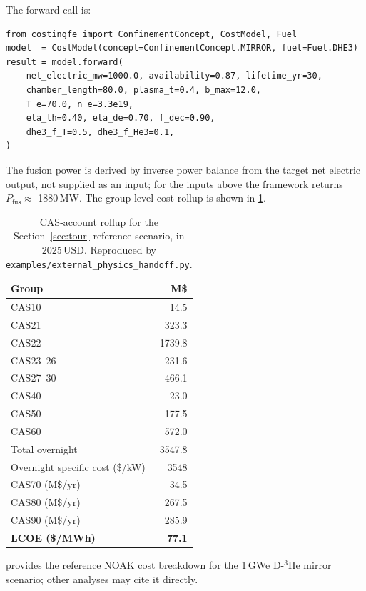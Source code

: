 \documentclass{article}
\begin{document}
The forward call is:

\begin{lstlisting}
from costingfe import ConfinementConcept, CostModel, Fuel
model  = CostModel(concept=ConfinementConcept.MIRROR, fuel=Fuel.DHE3)
result = model.forward(
    net_electric_mw=1000.0, availability=0.87, lifetime_yr=30,
    chamber_length=80.0, plasma_t=0.4, b_max=12.0,
    T_e=70.0, n_e=3.3e19,
    eta_th=0.40, eta_de=0.70, f_dec=0.90,
    dhe3_f_T=0.5, dhe3_f_He3=0.1,
)
\end{lstlisting}

The fusion power is derived by inverse power balance from the
target net electric output, not supplied as an input; for the inputs
above the framework returns $P_{\text{fus}} \approx$ 1880\,MW. The
group-level cost rollup is shown in \cref{tab:tour-rollup}.

\begin{table}[htbp]
\caption{CAS-account rollup for the Section~\ref{sec:tour} reference
scenario, in 2025\,USD. Reproduced by
\texttt{examples/external\_physics\_handoff.py}.}
\label{tab:tour-rollup}
\centering
\begin{tabular}{lr}
\toprule
Group & M\$ \\
\midrule
CAS10                  & 14.5 \\
CAS21                  & 323.3 \\
CAS22                  & 1739.8 \\
CAS23--26              & 231.6 \\
CAS27--30              & 466.1 \\
CAS40                  & 23.0 \\
CAS50                  & 177.5 \\
CAS60                  & 572.0 \\
\midrule
Total overnight        & 3547.8 \\
Overnight specific cost (\$/kW) & 3548 \\
\midrule
CAS70 (M\$/yr)         & 34.5 \\
CAS80 (M\$/yr)         & 267.5 \\
CAS90 (M\$/yr)         & 285.9 \\
\midrule
\textbf{LCOE (\$/MWh)} & \textbf{77.1} \\
\bottomrule
\end{tabular}
\end{table}

 provides the reference NOAK cost breakdown for the
1\,GWe D-${}^3$He mirror scenario; other analyses may cite it directly.
\end{document}
